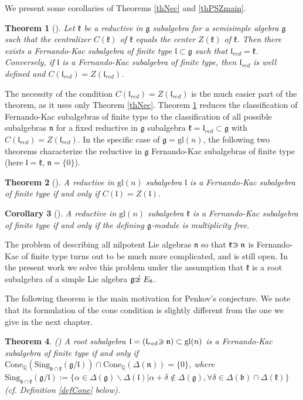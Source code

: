 \documentclass[12pt]{report}
\newtheorem{theo}{Theorem}[section]
\newtheorem{corollary}[theo]{Corollary}
\newcommand {\QQ} {\mathbb {Q}}
\newcommand{\kk}{\mathfrak{k}}
\newcommand{\nn}{\mathfrak{n}}
\newcommand{\gG}{\mathfrak{g}}
\newcommand{\bb}{\mathfrak{b}}
\newcommand{\lL}{\mathfrak{l}}
\newcommand{\refth}[1]{Theorem \ref{#1}}
\newcommand{\gl}{\mathrm{gl}}
\newcommand{\Cone}{\mathrm{Cone}}
\newcommand{\hw}{\mathrm{Sing}}
\def\crplus{\hbox{$\supset${\raise1.05pt\hbox{\kern -0.60em ${\scriptscriptstyle +}$}}\ }}
\def\nsimeq{\hbox{$\simeq${\raise1.05pt\hbox{\kern -0.55em $/$}}\ }}
\begin{document}
We present some corollaries of Theorems \ref{thNec} and \ref{thPSZmain}.
\begin{theo}[\cite{PSZ}]\label{thFK}
Let $\kk$ be a reductive in $\gG$ subalgebra for a semisimple algebra $\gG$ such that the centralizer $C(\kk)$ of $\kk$ equals the center $Z(\kk)$ of $\kk$. Then there exists a Fernando-Kac subalgebra of finite type $\lL\subset\gG$ such that $\lL_{red}=\kk$. Conversely, if $\lL$ is a Fernando-Kac subalgebra of finite type, then $\lL_{red}$ is well defined and $C(\lL_{red})=Z(\lL_{red})$.
\end{theo}
The necessity of the condition $C(\lL_{red})=Z(\lL_{red})$ is the much easier part of the theorem, as it uses only Theorem \ref{thNec}. \refth{thFK} reduces the classification of Fernando-Kac subalgebras of finite type to the classification of all possible subalgebras $\nn$ for a fixed reductive in $\gG$ subalgebra $\kk=\lL_{red}\subset\gG$ with $C(\lL_{red})=Z(\lL_{red})$. In the specific case of $\gG=\gl(n)$, the following two theorems characterize the reductive in $\gG$ Fernando-Kac subalgebras of finite type (here $\lL=\kk$, $\nn=\{0\}$).
\begin{theo}[\cite{PSZ}]\label{thgl(n)}
A reductive in $\gl(n)$ subalgebra $\lL$ is a Fernando-Kac subalgebra of finite type if and only if $C(\lL)=Z(\lL)$.
\end{theo}
\begin{corollary}[\cite{PSZ}]\label{corgl(n)red}
A reductive in $\gl(n)$ subalgebra $\kk$ is a Fernando-Kac subalgebra of finite type if and only if the defining $\gG$-module is multiplicity free.
\end{corollary}
The problem of describing all nilpotent Lie algebras $\nn$ so that $\kk\crplus\nn$ is Fernando-Kac of finite type turns out to be much more complicated, and is still open. In the present work we solve this problem under the assumption that $\kk$ is a root subalgebra of a simple Lie algebra $\gG\nsimeq E_8$.

The following theorem is the main motivation for Penkov's conjecture. We note that its formulation of the cone condition is slightly different from the one we give in the next chapter.
\begin{theo}\label{throots} (\cite{PSZ})
A root subalgebra $\lL=(\lL_{red}\crplus\nn)\subset\gl(n)$ is a Fernando-Kac subalgebra of finite type if and only if $\Cone_{\QQ}(\hw_{\bb\cap\kk}(\gG/\lL))\cap \Cone_{\QQ}(\Delta(\nn))=\{0\}$, where $\hw_{\bb\cap\kk}(\gG/\lL):= \{\alpha \in \Delta (\gG)\backslash\Delta(\lL) | \alpha + \delta \notin \Delta(\gG), \forall \delta \in\Delta(\bb)\cap\Delta(\kk)\}$ (cf. Definition \ref{defCone} below).
\end{theo}
\end{document}
